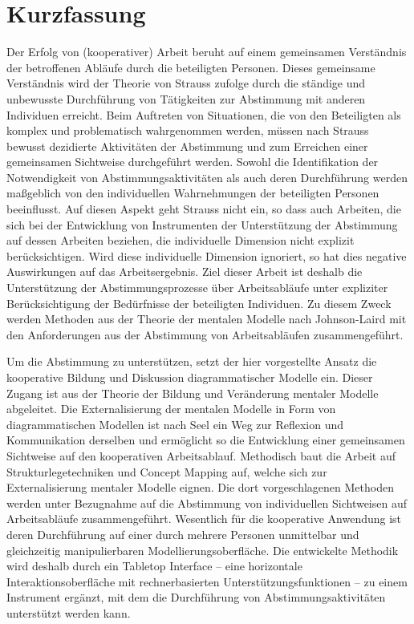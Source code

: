
\section*{Kurzfassung}
Der Erfolg von (kooperativer) Arbeit beruht auf einem gemeinsamen Verständnis der betroffenen Abläufe durch die beteiligten Personen. Dieses gemeinsame Verständnis wird der Theorie von Strauss zufolge durch die ständige und unbewusste Durchführung von Tätigkeiten zur Abstimmung mit anderen Individuen erreicht. Beim Auftreten von Situationen, die von den Beteiligten als komplex und problematisch wahrgenommen werden, müssen nach Strauss bewusst dezidierte Aktivitäten der Abstimmung und zum Erreichen einer gemeinsamen Sichtweise durchgeführt werden. Sowohl die Identifikation der Notwendigkeit von Abstimmungsaktivitäten als auch deren Durchführung werden maßgeblich von den individuellen Wahrnehmungen der beteiligten Personen beeinflusst. Auf diesen Aspekt geht Strauss nicht ein, so dass auch Arbeiten, die sich bei der Entwicklung von Instrumenten der Unterstützung der Abstimmung auf dessen Arbeiten beziehen, die individuelle Dimension nicht explizit berücksichtigen. Wird diese individuelle Dimension ignoriert, so hat dies negative Auswirkungen auf das Arbeitsergebnis. Ziel dieser Arbeit ist deshalb die Unterstützung der Abstimmungsprozesse über Arbeitsabläufe unter expliziter Berücksichtigung der Bedürfnisse der beteiligten Individuen. Zu diesem Zweck werden Methoden aus der Theorie der mentalen Modelle nach Johnson-Laird mit den Anforderungen aus der Abstimmung von Arbeitsabläufen zusammengeführt.

Um die Abstimmung zu unterstützen, setzt der hier vorgestellte Ansatz die kooperative Bildung und Diskussion diagrammatischer Modelle ein. Dieser Zugang ist aus der Theorie der Bildung und Veränderung mentaler Modelle abgeleitet. Die Externalisierung der mentalen Modelle in Form von diagrammatischen Modellen ist nach Seel ein Weg zur Reflexion und Kommunikation derselben und ermöglicht so die Entwicklung einer gemeinsamen Sichtweise auf den kooperativen Arbeitsablauf. Methodisch baut die Arbeit auf Strukturlegetechniken und Concept Mapping auf, welche sich zur Externalisierung mentaler Modelle eignen. Die dort vorgeschlagenen Methoden werden unter Bezugnahme auf die Abstimmung von individuellen Sichtweisen auf Arbeitsabläufe zusammengeführt. Wesentlich für die kooperative Anwendung ist deren Durchführung auf einer durch mehrere Personen unmittelbar und gleichzeitig manipulierbaren Modellierungsoberfläche. Die entwickelte Methodik wird deshalb durch ein Tabletop Interface -- eine horizontale Interaktionsoberfläche mit rechnerbasierten Unterstützungsfunktionen -- zu einem Instrument ergänzt, mit dem die Durchführung von Abstimmungsaktivitäten unterstützt werden kann. 

